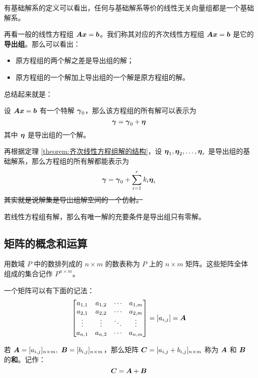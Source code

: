 有基础解系的定义可以看出，任何与基础解系等价的线性无关向量组都是一个基础解系。

再看一般的线性方程组 $\boldsymbol{A} \boldsymbol{x} = \boldsymbol{b}$。我们称其对应的齐次线性方程组 $\boldsymbol{A} \boldsymbol{x} = \boldsymbol{b}$ 是它的\textbf{导出组}。那么可以看出：

\begin{itemize}
	\item 原方程组的两个解之差是导出组的解；
	\item 原方程组的一个解加上导出组的一个解是原方程组的解。
\end{itemize}

总结起来就是：

\begin{theorem}
	设 $\boldsymbol{A} \boldsymbol{x} = \boldsymbol{b}$ 有一个特解 $\boldsymbol{\gamma}_0$，那么该方程组的所有解可以表示为
	$$
	\boldsymbol{\gamma} = \boldsymbol{\gamma}_0 + \boldsymbol{\eta}
	$$
	其中 $\boldsymbol{\eta}$ 是导出组的一个解。
\end{theorem}

再根据定理 \ref{theorem:齐次线性方程组解的结构}，设 $\boldsymbol{\eta}_1, \boldsymbol{\eta}_2, \dots, \boldsymbol{\eta}_r$ 是导出组的基础解系，那么方程组的所有解都能表示为
$$
\boldsymbol{\gamma} = \boldsymbol{\gamma}_0 + \sum_{i=1}^r k_i \boldsymbol{\eta}_i
$$
\sout{其实就是说解集是导出组解空间的一个仿射。}

\begin{corollary}
	若线性方程组有解，那么有唯一解的充要条件是导出组只有零解。
\end{corollary}

\subsection{矩阵的概念和运算}

用数域 $P$ 中的数排列成的 $n \times m$ 的数表称为 $P$ 上的 $n \times m$ 矩阵。这些矩阵全体组成的集合记作 $P^{n \times m}$。

一个矩阵可以有下面的记法：
$$
\begin{bmatrix}
	a_{1,1} & a_{1,2} & \cdots & a_{1,m} \\
	a_{2,1} & a_{2,2} & \cdots & a_{2,m} \\
	\vdots & \vdots & \ddots & \vdots \\
	a_{n,1} & a_{n,2} & \cdots & a_{n,m}
\end{bmatrix} = [a_{i,j}] = \boldsymbol{A}
$$

\begin{definition}[矩阵的加法]
	若 $\matr{A} = [a_{i,j}]_{n \times m},\ \matr{B} = [b_{i,j}]_{n \times m}$，那么矩阵 $\boldsymbol{C} = [a_{i,j} + b_{i,j}]_{n \times m}$ 称为 $\boldsymbol{A}$ 和 $\boldsymbol{B}$ 的\textbf{和}。记作：
	$$
	\boldsymbol{C} = \boldsymbol{A} + \boldsymbol{B}
	$$
\end{definition}

